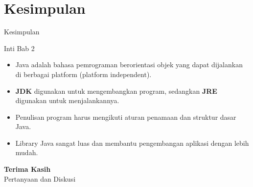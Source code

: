 \documentclass{beamer}
\begin{document}
\section{Kesimpulan}
\begin{frame}{Kesimpulan}
  \begin{alertblock}{Inti Bab 2}
    \begin{itemize}
      \item Java adalah bahasa pemrograman berorientasi objek yang dapat dijalankan di berbagai platform (platform independent).
      \item \textbf{JDK} digunakan untuk mengembangkan program, sedangkan \textbf{JRE} digunakan untuk menjalankannya.
      \item Penulisan program harus mengikuti aturan penamaan dan struktur dasar Java.
      \item Library Java sangat luas dan membantu pengembangan aplikasi dengan lebih mudah.
    \end{itemize}
  \end{alertblock}
\end{frame}


\begin{frame}[standout]
  \Huge \textbf{Terima Kasih} \\[1.5em]
  \Large Pertanyaan dan Diskusi
\end{frame}
\end{document}
